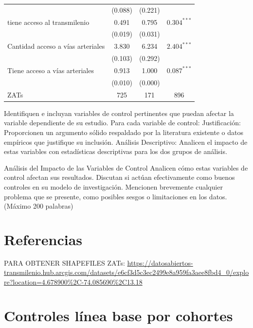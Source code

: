 \documentclass{article}
\begin{document}
\begin{table} [H]
\begin{adjustbox}{width=\textwidth,center}
\begin{tabular}{l c c c}
      & (0.088) & (0.221) & \\
      tiene acceso al transmilenio & 0.491 & 0.795 & $0.304^{***}$ \\
      & (0.019) & (0.031) & \\
      Cantidad acceso a vías arteriales & 3.830 & 6.234 & $2.404^{***}$ \\
      & (0.103) & (0.292) & \\
      Tiene acceso a vías arteriales & 0.913 & 1.000 & $0.087^{***}$ \\
      & (0.010) & (0.000) & \\
      \midrule
      \midrule
      ZATs & 725 & 171 & 896 \\
      \bottomrule
    \end{tabular}
  \end{adjustbox}
\end{table}

Identifiquen e incluyan variables de control pertinentes que puedan afectar la variable dependiente de su estudio. Para cada variable de control:
Justificación: Proporcionen un argumento sólido respaldado por la literatura existente o datos empíricos que justifique su inclusión.
Análisis Descriptivo: Analicen el impacto de estas variables con estadísticas descriptivas para los dos grupos de análisis.

Análisis del Impacto de las Variables de Control
Analicen cómo estas variables de control afectan sus resultados. Discutan si actúan
efectivamente como buenos controles en su modelo de investigación. Mencionen
brevemente cualquier problema que se presente, como posibles sesgos o limitaciones en los
datos. (Máximo 200 palabras)


\section{Referencias}

\printbibliography

PARA OBTENER SHAPEFILES ZATs: \url{https://datosabiertos-transmilenio.hub.arcgis.com/datasets/e6cf3d5c3ec2499e8a959fa3aee8fbd4_0/explore?location=4.678900%2C-74.085690%2C13.18}


\appendix
{}

\section{Controles línea base por cohortes}
\end{document}
